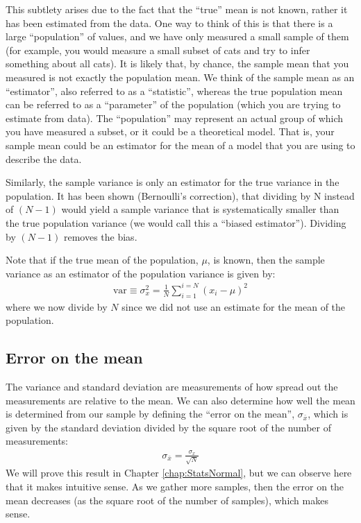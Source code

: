 This subtlety arises due to the fact that the ``true'' mean is not known, rather it has been estimated from the data. One way to think of this is that there is a large ``population'' of values, and we have only measured a small sample of them (for example, you would measure a small subset of cats and try to infer something about all cats). It is likely that, by chance, the sample mean that you measured is not exactly the population mean. We think of the sample mean as an ``estimator'', also referred to as a ``statistic'', whereas the true population mean can be referred to as a ``parameter'' of the population (which you are trying to estimate from data). The ``population'' may represent an actual group of which you have measured a subset, or it could be a theoretical model. That is, your sample mean could be an estimator for the mean of a model that you are using to describe the data.

Similarly, the sample variance is only an estimator for the true variance in the population. It has been shown (Bernoulli's correction), that dividing by N instead of $(N-1)$ would yield a sample variance that is systematically smaller than the true population variance (we would call this a ``biased estimator''). Dividing by $(N-1)$ removes the bias. 

Note that if the true mean of the population, $\mu$, is known, then the sample variance as an estimator of the population variance is given by:
\begin{align}
 \text{var}\equiv \sigma_x^2 = \frac{1}{N} \sum_{i=1}^{i=N} (x_i-\mu)^2 
\end{align}
where we now divide by $N$ since we did not use an estimate for the mean of the population.
 
\subsection{Error on the mean} 
The variance and standard deviation are measurements of how spread out the measurements are relative to the mean. We can also determine how well the mean is determined from our sample by defining the ``error on the mean'', $\sigma_{\bar x}$, which is given by the standard deviation divided by the square root of the number of measurements:
\begin{align}
 \sigma_{\bar x}= \frac{\sigma_x}{\sqrt N}
\end{align}
We will prove this result in Chapter \ref{chap:StatsNormal}, but we can observe here that it makes intuitive sense. As we gather more samples, then the error on the mean decreases (as the square root of the number of samples), which makes sense. 
 
